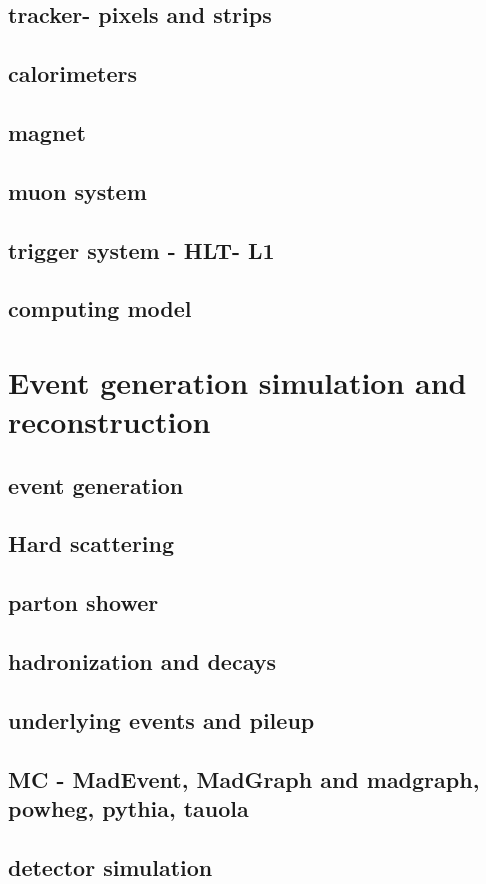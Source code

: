 \subsection{tracker- pixels and strips }
\subsection{calorimeters}
\subsection{magnet }
\subsection{muon system }
\subsection{trigger system - HLT- L1 }
\subsection{ computing model}
\section{Event generation  simulation and reconstruction}
\subsection{ event generation}
\subsection{Hard scattering  }
\subsection{parton shower }
\subsection{hadronization and decays }
\subsection{underlying events and pileup }
\subsection{ MC - MadEvent, MadGraph and madgraph\@NLO, powheg, pythia, tauola}
\subsection{ detector simulation}

